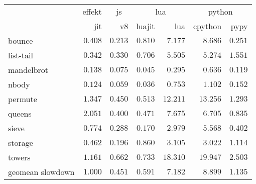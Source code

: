 \begin{tabular}{l r r r r r r}
\toprule & \multicolumn{1}{c}{effekt} & \multicolumn{1}{c}{js} & \multicolumn{2}{c}{lua} & \multicolumn{2}{c}{python} \\
\cmidrule(l){2-2}\cmidrule(l){3-3}\cmidrule(l){4-5}\cmidrule(l){6-7} 
 & jit & v8 & luajit & lua & cpython & pypy \\
\midrule
bounce & $0.408$ & $\mathbf{0.213}$ & $0.810$ & $7.177$ & $8.686$ & $0.251$ \\
list-tail & $0.342$ & $\mathbf{0.330}$ & $0.706$ & $5.505$ & $5.274$ & $1.551$ \\
mandelbrot & $0.138$ & $0.075$ & $\mathbf{0.045}$ & $0.295$ & $0.636$ & $0.119$ \\
nbody & $0.124$ & $0.059$ & $\mathbf{0.036}$ & $0.753$ & $1.102$ & $0.152$ \\
permute & $1.347$ & $\mathbf{0.450}$ & $0.513$ & $12.211$ & $13.256$ & $1.293$ \\
queens & $2.051$ & $\mathbf{0.400}$ & $0.471$ & $7.675$ & $6.705$ & $0.835$ \\
sieve & $0.774$ & $0.288$ & $\mathbf{0.170}$ & $2.979$ & $5.568$ & $0.402$ \\
storage & $0.462$ & $\mathbf{0.196}$ & $0.860$ & $3.105$ & $3.022$ & $1.114$ \\
towers & $1.161$ & $\mathbf{0.662}$ & $0.733$ & $18.310$ & $19.947$ & $2.503$ \\
\midrule
 geomean slowdown & $1.000$ & $0.451$ & $0.591$ & $7.182$ & $8.899$ & $1.135$ \\
\bottomrule
\end{tabular}